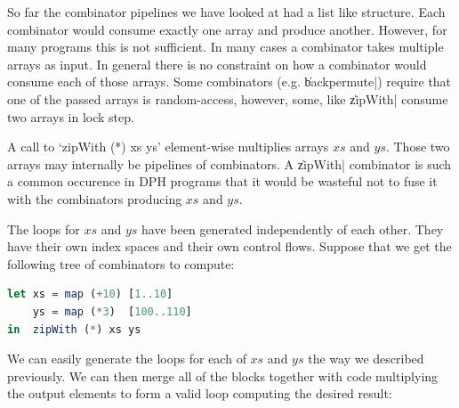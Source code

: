 \documentclass[preamble.tex]{subfiles}
\begin{document}
So far the combinator pipelines we have looked at had a list like structure. Each combinator would consume exactly one array and produce another. However, for many programs this is not sufficient. In many cases a combinator takes multiple arrays as input. In general there is no constraint on how a combinator would consume each of those arrays. Some combinators (e.g. \|backpermute|) require that one of the passed arrays is random-access, however, some, like \|zipWith| consume two arrays in lock step.

A call to `zipWith (*) xs ys' element-wise multiplies arrays $xs$ and $ys$. Those two arrays may internally be pipelines of combinators. A \|zipWith| combinator is such a common occurence in DPH programs that it would be wasteful not to fuse it with the combinators producing $xs$ and $ys$.


The loops for $xs$ and $ys$ have been generated independently of each other. They have their own index spaces and their own control flows. Suppose that we get the following tree of combinators to compute:

\begin{lstlisting}[language=haskell]
let xs = map (+10) [1..10]
    ys = map (*3)  [100..110]
in  zipWith (*) xs ys
\end{lstlisting}

We can easily generate the loops for each of $xs$ and $ys$ the way we described previously. We can then merge all of the blocks together with code multiplying the output elements to form a valid loop computing the desired result:
\end{document}
